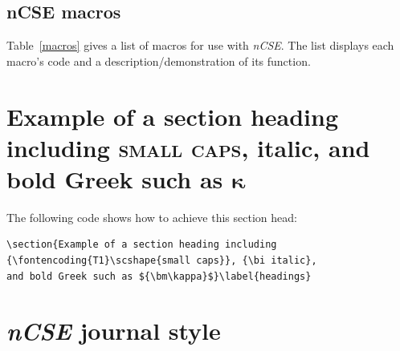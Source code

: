 \documentclass{nCSE2e}
\begin{document}
\subsection{{\bi nCSE} macros}

Table~\ref{macros} gives a list of macros for use with {\it nCSE}. The list displays each macro's code and a
description/demonstration of its function.

\begin{table} 
\label{macros}
\end{table}


\section{Example of a section heading including {\scshape{small caps}},
   {\bi italic}, and bold Greek such as ${\bm\kappa}$}\label{headings}
%
The following code shows how to achieve this section head:
%
\begin{verbatim}
\section{Example of a section heading including
{\fontencoding{T1}\scshape{small caps}}, {\bi italic},
and bold Greek such as ${\bm\kappa}$}\label{headings}
\end{verbatim}
%
%

\section{{\textit{nCSE}} journal style}
\end{document}
